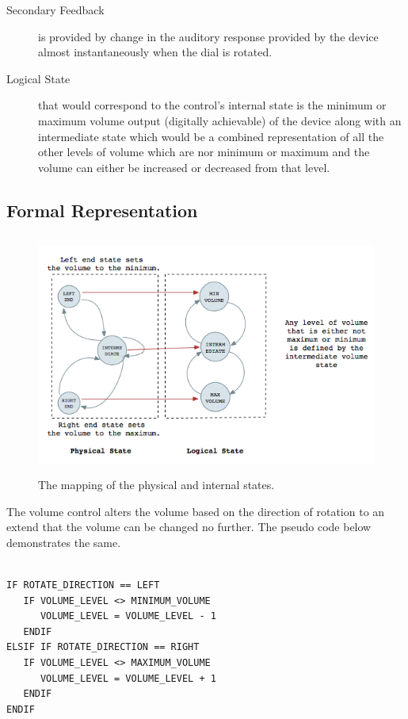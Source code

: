 \documentclass[10pt,a4paper]{article}
\begin{document}
\begin{description}

\item [Secondary Feedback] is provided by change in the auditory response provided by the device almost instantaneously when the dial is rotated.
\item [Logical State] that would correspond to the control's internal state is the minimum or maximum volume output (digitally achievable) of the device along with an intermediate state which would be a combined representation of all the other levels of volume which are nor minimum or maximum and the volume can either be increased or decreased from that level.

\end{description}

\subsection{Formal Representation}

\begin{figure}[hbpt]
\centerline{\includegraphics[width=556px,height=300px,keepaspectratio]{VC2}}
\caption {The mapping of the physical and internal states.}
\label{physical_state_power_switch}
\end{figure}

\noindent
The volume control alters the volume based on the direction of rotation to an extend that the volume can be changed no further. The pseudo code below demonstrates the same.
\begin{center}
\begin{verbatim} 

IF ROTATE_DIRECTION == LEFT
   IF VOLUME_LEVEL <> MINIMUM_VOLUME
      VOLUME_LEVEL = VOLUME_LEVEL - 1
   ENDIF
ELSIF IF ROTATE_DIRECTION == RIGHT
   IF VOLUME_LEVEL <> MAXIMUM_VOLUME
      VOLUME_LEVEL = VOLUME_LEVEL + 1
   ENDIF
ENDIF

\end{verbatim} 
\end{center}
\end{document}
